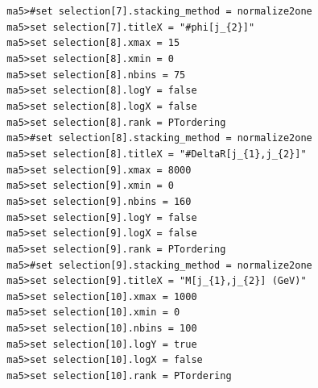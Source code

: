\documentclass[a4paper, 10pt]{article}
\begin{document}
\texttt{ }\texttt{ }\texttt{ma5>\#set selection[7].stacking\_method = normalize2one\\
}
\texttt{ }\texttt{ }\texttt{ma5>set selection[7].titleX = "\#phi[j\_\{2\}]"\\
}
\texttt{ }\texttt{ }\texttt{ma5>set selection[8].xmax = 15\\
}
\texttt{ }\texttt{ }\texttt{ma5>set selection[8].xmin = 0\\
}
\texttt{ }\texttt{ }\texttt{ma5>set selection[8].nbins = 75\\
}
\texttt{ }\texttt{ }\texttt{ma5>set selection[8].logY = false\\
}
\texttt{ }\texttt{ }\texttt{ma5>set selection[8].logX = false\\
}
\texttt{ }\texttt{ }\texttt{ma5>set selection[8].rank = PTordering\\
}
\texttt{ }\texttt{ }\texttt{ma5>\#set selection[8].stacking\_method = normalize2one\\
}
\texttt{ }\texttt{ }\texttt{ma5>set selection[8].titleX = "\#DeltaR[j\_\{1\},j\_\{2\}]"\\
}
\texttt{ }\texttt{ }\texttt{ma5>set selection[9].xmax = 8000\\
}
\texttt{ }\texttt{ }\texttt{ma5>set selection[9].xmin = 0\\
}
\texttt{ }\texttt{ }\texttt{ma5>set selection[9].nbins = 160\\
}
\texttt{ }\texttt{ }\texttt{ma5>set selection[9].logY = false\\
}
\texttt{ }\texttt{ }\texttt{ma5>set selection[9].logX = false\\
}
\texttt{ }\texttt{ }\texttt{ma5>set selection[9].rank = PTordering\\
}
\texttt{ }\texttt{ }\texttt{ma5>\#set selection[9].stacking\_method = normalize2one\\
}
\texttt{ }\texttt{ }\texttt{ma5>set selection[9].titleX = "M[j\_\{1\},j\_\{2\}] (GeV)"\\
}
\texttt{ }\texttt{ }\texttt{ma5>set selection[10].xmax = 1000\\
}
\texttt{ }\texttt{ }\texttt{ma5>set selection[10].xmin = 0\\
}
\texttt{ }\texttt{ }\texttt{ma5>set selection[10].nbins = 100\\
}
\texttt{ }\texttt{ }\texttt{ma5>set selection[10].logY = true\\
}
\texttt{ }\texttt{ }\texttt{ma5>set selection[10].logX = false\\
}
\texttt{ }\texttt{ }\texttt{ma5>set selection[10].rank = PTordering\\
}
\end{document}
